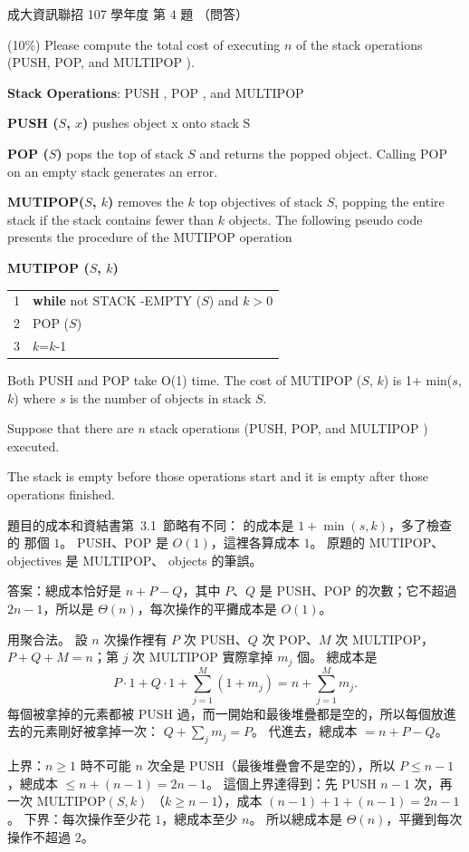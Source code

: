 \begin{pastexam}[label={px:ncku-107-prog-04}]{成大資訊聯招 107 學年度 第 4 題}
（問答）

(10\%) Please compute the total cost of executing $n$ of the stack operations (PUSH, POP,
and MULTIPOP ).

\textbf{Stack Operations}: PUSH , POP , and MULTIPOP

\textbf{PUSH ($S$, $x$)} pushes object x onto stack S

\textbf{POP ($S$)} pops the top of stack $S$ and returns the popped object. Calling POP on
an empty stack generates an error.

\textbf{MUTIPOP($S$, $k$)} removes the $k$ top objectives of stack $S$, popping the entire
stack if the stack contains fewer than $k$ objects. The following pseudo code presents the
procedure of the MUTIPOP operation

\textbf{MUTIPOP ($S$, $k$)}

\begin{tabular}{ll}
1 & \textbf{while} not STACK -EMPTY ($S$) and $k>0$ \\
2 & \quad POP ($S$) \\
3 & \quad $k$=$k$-1
\end{tabular}

Both PUSH and POP take O(1) time. The cost of MUTIPOP ($S$, $k$) is 1+ min($s$, $k$) where
$s$ is the number of objects in stack $S$.

Suppose that there are $n$ stack operations (PUSH, POP, and MULTIPOP ) executed.

The stack is empty before those operations start and it is empty after those operations
finished.
\end{pastexam}

\begin{pastsoln}
題目的成本和資結書第~3.1~節略有不同： 的成本是 $1 + \min(s, k)$，多了檢查的
那個 $1$。 PUSH、POP 是 $O(1)$，這裡各算成本 $1$。 原題的 MUTIPOP、objectives 是 MULTIPOP、
objects 的筆誤。

答案：總成本恰好是 $n + P - Q$，其中 $P$、$Q$ 是 PUSH、POP 的次數；它不超過 $2n - 1$，所以是
$\Theta(n)$，每次操作的平攤成本是 $O(1)$。

用聚合法。 設 $n$ 次操作裡有 $P$ 次 PUSH、$Q$ 次 POP、$M$ 次 MULTIPOP，$P + Q + M = n$；第 $j$
次 MULTIPOP 實際拿掉 $m_j$ 個。 總成本是
\[
P \cdot 1 + Q \cdot 1 + \sum_{j=1}^{M} (1 + m_j) = n + \sum_{j=1}^{M} m_j .
\]
每個被拿掉的元素都被 PUSH 過，而一開始和最後堆疊都是空的，所以每個放進去的元素剛好被拿掉一次：
$Q + \sum_j m_j = P$。 代進去，總成本 $= n + P - Q$。

上界：$n \ge 1$ 時不可能 $n$ 次全是 PUSH（最後堆疊會不是空的），所以 $P \le n - 1$，總成本
$\le n + (n - 1) = 2n - 1$。 這個上界達得到：先 PUSH $n - 1$ 次，再一次 MULTIPOP$(S, k)$
（$k \ge n - 1$），成本 $(n - 1) + 1 + (n - 1) = 2n - 1$。 下界：每次操作至少花 $1$，總成本至少
$n$。 所以總成本是 $\Theta(n)$，平攤到每次操作不超過 $2$。
\end{pastsoln}
